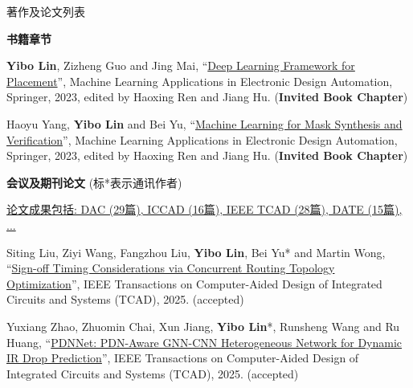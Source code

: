 \begin{rSection}{著作及论文列表}



\textbf{书籍章节}
        

\begin{description}[font=\normalfont, rightmargin=2em]
    

\item[{[B3]}]{
        \textbf{Yibo Lin}, Zizheng Guo and Jing Mai, 
    ``\href{https://doi.org/10.1007/978-3-031-13074-8}{Deep Learning Framework for Placement}'', 
    Machine Learning Applications in Electronic Design Automation, Springer, 2023, edited by Haoxing Ren and Jiang Hu.
    (\textbf{Invited Book Chapter})
}
            

\item[{[B2]}]{
        Haoyu Yang, \textbf{Yibo Lin} and Bei Yu, 
    ``\href{https://doi.org/10.1007/978-3-031-13074-8}{Machine Learning for Mask Synthesis and Verification}'', 
    Machine Learning Applications in Electronic Design Automation, Springer, 2023, edited by Haoxing Ren and Jiang Hu.
    (\textbf{Invited Book Chapter})
}
            

\end{description}
    

\textbf{会议及期刊论文} (标*表示通讯作者)
        

            \underline{论文成果包括: DAC (29篇), ICCAD (16篇), IEEE TCAD (28篇), DATE (15篇), ...} 
    

\begin{description}[font=\normalfont, rightmargin=2em]
    

\item[{[J190]}]{
        Siting Liu, Ziyi Wang, Fangzhou Liu, \textbf{Yibo Lin}, Bei Yu* and Martin Wong, 
    ``\href{https://doi.org/10.1109/TCAD.2024.3506216}{Sign-off Timing Considerations via Concurrent Routing Topology Optimization}'', 
    IEEE Transactions on Computer-Aided Design of Integrated Circuits and Systems (TCAD), 2025.
    (accepted)
}
            

\item[{[J189]}]{
        Yuxiang Zhao, Zhuomin Chai, Xun Jiang, \textbf{Yibo Lin}*, Runsheng Wang and Ru Huang, 
    ``\href{https://doi.org/10.1109/TCAD.2024.3509796}{PDNNet: PDN-Aware GNN-CNN Heterogeneous Network for Dynamic IR Drop Prediction}'', 
    IEEE Transactions on Computer-Aided Design of Integrated Circuits and Systems (TCAD), 2025.
    (accepted)
}
            


\end{description}
\end{rSection}
